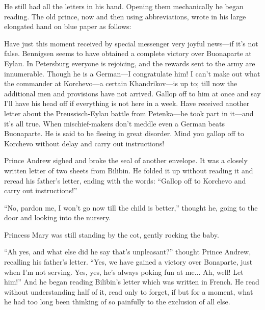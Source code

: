 He still had all the letters in his hand. Opening them
mechanically he began reading. The old prince, now and then using
abbreviations, wrote in his large elongated hand on blue paper as
follows:

Have just this moment received by special messenger very joyful
news---if it's not false. Bennigsen seems to have obtained a
complete victory over Buonaparte at Eylau. In Petersburg everyone
is rejoicing, and the rewards sent to the army are
innumerable. Though he is a German---I congratulate him! I can't
make out what the commander at Korchevo---a certain
Khandrikov---is up to; till now the additional men and provisions
have not arrived. Gallop off to him at once and say I'll have his
head off if everything is not here in a week. Have received
another letter about the Preussisch-Eylau battle from
Petenka---he took part in it---and it's all true. When
mischief-makers don't meddle even a German beats Buonaparte. He
is said to be fleeing in great disorder. Mind you gallop off to
Korchevo without delay and carry out instructions!

Prince Andrew sighed and broke the seal of another envelope. It
was a closely written letter of two sheets from Bilibin. He
folded it up without reading it and reread his father's letter,
ending with the words: ``Gallop off to Korchevo and carry out
instructions!''

``No, pardon me, I won't go now till the child is better,''
thought he, going to the door and looking into the nursery.

Princess Mary was still standing by the cot, gently rocking the
baby.

``Ah yes, and what else did he say that's unpleasant?'' thought
Prince Andrew, recalling his father's letter. ``Yes, we have
gained a victory over Bonaparte, just when I'm not serving. Yes,
yes, he's always poking fun at me... Ah, well! Let him!'' And he
began reading Bilibin's letter which was written in French. He
read without understanding half of it, read only to forget, if
but for a moment, what he had too long been thinking of so
painfully to the exclusion of all else.


